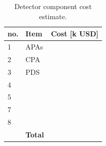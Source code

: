 \begin{table}[h!]
\centering
\begin{tabular}{| l| l| c |}
\hline
\textbf{no. } & \textbf{Item}  & \textbf{Cost [k USD]}  \\ \hline
1 & APAs & \\
2 & CPA  & \\
3 &PDS  & \\
4 & & \\
5 & & \\
7 & & \\
8 & & \\ \hline
  & \textbf{Total } & \\ \hline
\end{tabular}
\caption{Detector component cost estimate.}
\label{tab:cost}
\end{table}














